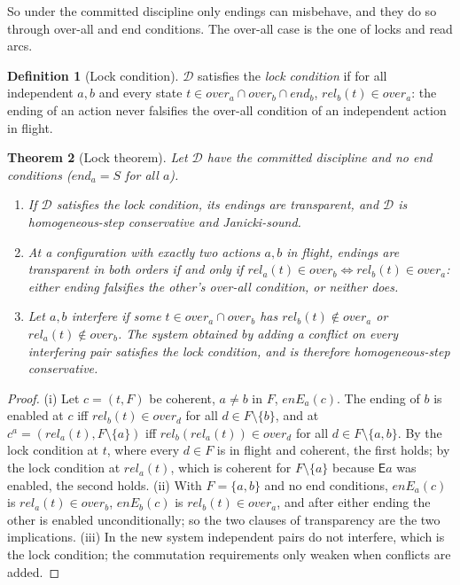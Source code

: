 \documentclass[preprint,12pt]{elsarticle}
\theoremstyle{plain}
\newtheorem{theorem}{Theorem}[section]
\theoremstyle{definition}
\newtheorem{definition}[theorem]{Definition}
\newcommand{\ovr}{\mathit{over}}
\newcommand{\stp}{\mathit{end}}
\newcommand{\rel}{\mathit{rel}}
\newcommand{\E}[1]{\mathsf{E}#1}
\newcommand{\D}{\mathcal{D}}
\newcommand{\enE}[2]{\mathit{enE}_{#1}(#2)}
\begin{document}
So under the committed discipline only endings can misbehave, and they do so through over-all and end conditions. The over-all case is the one of locks and read arcs.

\begin{definition}[Lock condition]
\label{def:lock}
$\D$ satisfies the \emph{lock condition} if for all independent $a, b$ and every state $t \in \ovr_a \cap \ovr_b \cap \stp_b$, $\rel_b(t) \in \ovr_a$: the ending of an action never falsifies the over-all condition of an independent action in flight.
\end{definition}

\begin{theorem}[Lock theorem]
\label{thm:lock}
Let $\D$ have the committed discipline and no end conditions ($\stp_a = S$ for all $a$).
\begin{enumerate}
\item[(i)] If $\D$ satisfies the lock condition, its endings are transparent, and $\D$ is homogeneous-step conservative and Janicki-sound.
\item[(ii)] At a configuration with exactly two actions $a, b$ in flight, endings are transparent in both orders if and only if $\rel_a(t) \in \ovr_b \iff \rel_b(t) \in \ovr_a$: either ending falsifies the other's over-all condition, or neither does.
\item[(iii)] Let $a, b$ \emph{interfere} if some $t \in \ovr_a \cap \ovr_b$ has $\rel_b(t) \notin \ovr_a$ or $\rel_a(t) \notin \ovr_b$. The system obtained by adding a conflict on every interfering pair satisfies the lock condition, and is therefore homogeneous-step conservative.
\end{enumerate}
\end{theorem}

\begin{proof}
(i) Let $c = (t, F)$ be coherent, $a \neq b$ in $F$, $\enE{a}{c}$. The ending of $b$ is enabled at $c$ iff $\rel_b(t) \in \ovr_d$ for all $d \in F \setminus \{b\}$, and at $c^a = (\rel_a(t), F \setminus \{a\})$ iff $\rel_b(\rel_a(t)) \in \ovr_d$ for all $d \in F \setminus \{a, b\}$. By the lock condition at $t$, where every $d \in F$ is in flight and coherent, the first holds; by the lock condition at $\rel_a(t)$, which is coherent for $F \setminus \{a\}$ because $\E{a}$ was enabled, the second holds. (ii) With $F = \{a, b\}$ and no end conditions, $\enE{a}{c}$ is $\rel_a(t) \in \ovr_b$, $\enE{b}{c}$ is $\rel_b(t) \in \ovr_a$, and after either ending the other is enabled unconditionally; so the two clauses of transparency are the two implications. (iii) In the new system independent pairs do not interfere, which is the lock condition; the commutation requirements only weaken when conflicts are added.
\end{proof}
\end{document}
